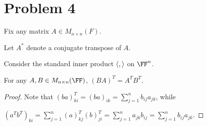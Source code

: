\documentclass[11pt]{scrartcl}
\begin{document}
\section*{Problem 4}

Fix any matrix $A \in M_{n \times n}(F)$.

Let $A^*$ denote a conjugate transpose of $A$.

Consider the standard inner product $\langle \*,\*\rangle$ on $\FF^n$.

\begin{lemma}
  \label{tr}
  For any $A, B \in M_{n\times n}(\FF)$, $(BA)^T=A^TB^T$.
\end{lemma}
\begin{proof}
  Note that $(ba)_{ki}^T = (ba)_{ik} = \sum_{j=1}^nb_{ij}a_{jk}$, while

  $(a^Tb^T)_{ki} = \sum_{j=1}^n(a)^T_{kj}(b)^T_{ji} = \sum_{j=1}^na_{jk}b_{ij} = \sum_{j=1}^nb_{ij}a_{jk}$.
\end{proof}
\end{document}

